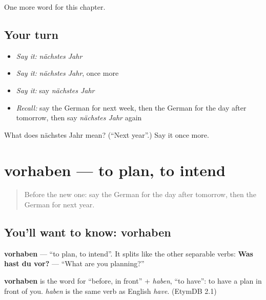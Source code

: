 \begin{grammarlens}[title={What you've built}]
One more word for this chapter.
\end{grammarlens}

\subsection*{Your turn}
\begin{itemize}
\raggedright
  \item \emph{Say it:} \emph{nächstes Jahr}
  \item \emph{Say it:} \emph{nächstes Jahr}, once more
  \item \emph{Say it:} say \emph{nächstes Jahr}
  \item \emph{Recall:} say the German for next week, then the German for the day after tomorrow, then say \emph{nächstes Jahr} again
\end{itemize}

\begin{tcolorbox}[breakable,colback=teal!4,colframe=teal!35!black,title={Before you move on}]
What does nächstes Jahr mean? (\textquotedblleft{}Next year\textquotedblright{}.) Say it once more.
\end{tcolorbox}
\section[vorhaben]{vorhaben — to plan, to intend}

\label{lesson:GE-C142-vorhaben}



\begin{quote}
Before the new one: say the German for the day after tomorrow, then the German for next year.
\end{quote}

\subsection*{You'll want to know: vorhaben}
\textbf{vorhaben} — \textquotedblleft{}to plan, to intend\textquotedblright{}. It splits like the other separable verbs: \textbf{Was hast du vor?} — \textquotedblleft{}What are you planning?\textquotedblright{}

\begin{cousinweb}
\textbf{vorhaben} is the word for \textquotedblleft{}before, in front\textquotedblright{} + \emph{haben}, \textquotedblleft{}to have\textquotedblright{}: to have a plan in front of you. \emph{haben} is the same verb as English \emph{have}. (EtymDB 2.1)
\end{cousinweb}

